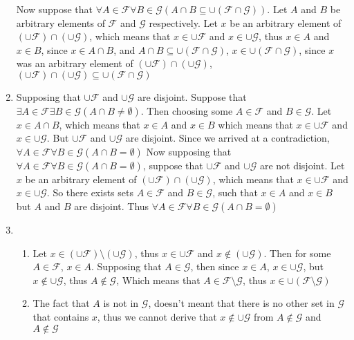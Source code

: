 \begin{enumerate}
    Now suppose that $\forall A \in \mathscr{F} \forall B \in \mathscr{G}(A \cap B \subseteq \cup (\mathscr{F} \cap \mathscr{G}))$. Let $A$ and $B$ be arbitrary elements of $\mathscr{F}$ and $\mathscr{G}$ respectively. Let $x$ be an arbitrary element of $(\cup \mathscr{F}) \cap (\cup \mathscr{G})$, which means that $x \in \cup \mathscr{F}$ and $x \in \cup \mathscr{G}$, thus $x \in A$ and $x \in B$, since $x \in A \cap B$, and $A \cap B \subseteq \cup (\mathscr{F} \cap \mathscr{G})$, $x \in \cup (\mathscr{F} \cap \mathscr{G})$, since $x$ was an arbitrary element of $(\cup \mathscr{F}) \cap (\cup \mathscr{G})$, $(\cup \mathscr{F}) \cap (\cup \mathscr{G}) \subseteq \cup (\mathscr{F} \cap \mathscr{G})$
    \item
    Supposing that $\cup \mathscr{F}$ and $\cup \mathscr{G}$ are disjoint. Suppose that $\exists A \in \mathscr{F} \exists B \in \mathscr{G} (A \cap B \neq \emptyset)$. Then choosing some $A \in \mathscr{F}$ and $B \in \mathscr{G}$. Let $x \in A \cap B$, which means that $x \in A$ and $x \in B$ which means that $x \in \cup \mathscr{F}$ and $x \in \cup \mathscr{G}$. But $\cup \mathscr{F}$ and $\cup \mathscr{G}$ are disjoint. Since we arrived at a contradiction, $\forall A \in \mathscr{F} \forall B \in \mathscr{G} (A \cap B = \emptyset)$
    Now supposing that $\forall A \in \mathscr{F} \forall B \in \mathscr{G} (A \cap B = \emptyset)$, suppose that $\cup \mathscr{F}$ and $\cup \mathscr{G}$ are not disjoint. Let $x$ be an arbitrary element of $(\cup \mathscr{F}) \cap (\cup \mathscr{G})$, which means that $x \in \cup \mathscr{F}$ and $x \in \cup \mathscr{G}$. So there exists sets $A \in \mathscr{F}$ and $B \in \mathscr{G}$, such that $x \in A$ and $x \in B$ but $A$ and $B$ are disjoint. Thus $\forall A \in \mathscr{F} \forall B \in \mathscr{G} (A \cap B = \emptyset)$
    \item
    \begin{enumerate}
        \item 
    Let $x \in (\cup \mathscr{F}) \setminus (\cup \mathscr{G})$, thus $x \in \cup \mathscr{F}$ and $x \notin (\cup \mathscr{G})$. Then for some $A \in \mathscr{F}$, $x \in A$. Supposing that $A \in \mathscr{G}$, then since $x \in A$, $x \in \cup \mathscr{G}$, but $x \notin \cup \mathscr{G}$, thus $A \notin \mathscr{G}$, Which means that $A \in \mathscr{F} \setminus \mathscr{G}$, thus $x \in \cup (\mathscr{F} \setminus \mathscr{G})$
        \item 
    The fact that $A$ is not in $\mathscr{G}$, doesn't meant that there is no other set in $\mathscr{G}$ that contains $x$, thus we cannot derive that $x \notin \cup \mathscr{G}$ from $A \notin \mathscr{G}$ and $A \notin \mathscr{G}$

\end{enumerate}
\end{enumerate}

